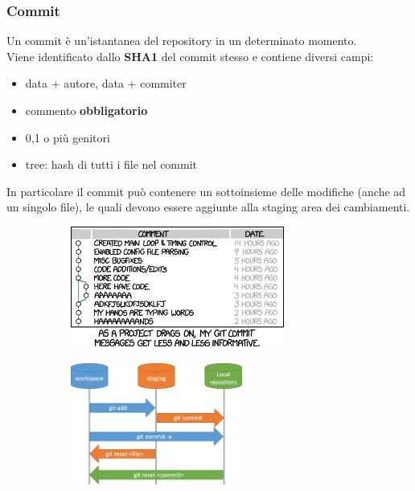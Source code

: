 \documentclass[12pt]{article}
\begin{document}
    \subsubsection{Commit}
    Un commit è un'istantanea del repository in un determinato momento.\\
    Viene identificato dallo \textbf{SHA1} del commit stesso e contiene diversi campi:
    \begin{itemize}
      \item data + autore, data + commiter
      \item commento \textbf{obbligatorio}
      \item 0,1 o più genitori
      \item tree: hash di tutti i file nel commit
    \end{itemize}
    \begin{minipage}{\textwidth}
      In particolare il commit può contenere un sottoinsieme delle modifiche (anche ad un singolo file), le quali devono essere aggiunte alla staging area dei cambiamenti.
      \begin{figure}[H]
        \centering
        \begin{subfigure}{0.49\textwidth}
          \centering
          \includegraphics[height=4cm]{introduzione_a_git/git_commit.png}
        \end{subfigure}
        \hfill
        \begin{subfigure}{0.49\textwidth}
          \centering
          \includegraphics[height=4cm]{introduzione_a_git/git_commit_staging.png}
        \end{subfigure}
      \end{figure}
    \end{minipage}
\end{document}
